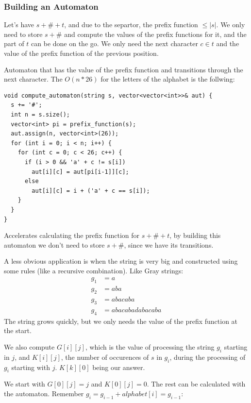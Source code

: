 \documentclass{IEEEtran}
\begin{document}
      \subsubsection{Building an Automaton}
        Let's have $s+\#+t$, and due to the separtor, the prefix function $\leq |s|$. We only need to store $s+\#$ and compute the values of the prefix functions for it, and the part of $t$ can be done on the go. We only need the next character $c\in t$ and the value of the prefix function of the previous position. \par 
        Automaton that has the value of the prefix function and transitions through the next character. The $O(n*26)$ for the letters of the alphabet is the follwing:
        \begin{lstlisting}
void compute_automaton(string s, vector<vector<int>>& aut) {
  s += '#';
  int n = s.size();
  vector<int> pi = prefix_function(s);
  aut.assign(n, vector<int>(26));
  for (int i = 0; i < n; i++) {
    for (int c = 0; c < 26; c++) {
      if (i > 0 && 'a' + c != s[i])
        aut[i][c] = aut[pi[i-1]][c];
      else
        aut[i][c] = i + ('a' + c == s[i]);
    }
  }
}
        \end{lstlisting}
        \par Accelerates calculating the prefix function for $s+\#+t$, by building this automaton we don't need to store $s+\#$, since we have its transitions.\par 
        A less obvious application is when the string is very big and constructed using some rules (like a recursive combination). Like Gray strings:
        \begin{equation}
          \begin{aligned}
            g_1&=a\\
            g_2&=aba\\
            g_3&=abacaba\\
            g_4&=abacabadabacaba
          \end{aligned}
        \end{equation}
        The string grows quickly, but we only needs the value of the prefix function at the start.\par 
        We also compute $G[i][j]$, which is the value of processing the string $g_i$ starting in $j$, and $K[i][j]$, the number of occurences of $s$ in $g_i$, during the processing of $g_i$ starting with $j$. $K[k][0]$ being our answer.\par 
        We start with $G[0][j]=j$ and $K[0][j]=0$. The rest can be calculated with the automaton. Remember $g_i=g_{i-1}+alphabet[i]=g_{i-1}$:
\end{document}
